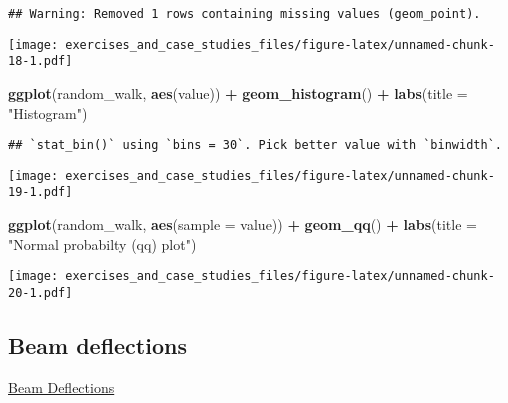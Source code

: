 \documentclass[]{book}
\newenvironment{Shaded}{\begin{snugshade}}{\end{snugshade}}
\newcommand{\DataTypeTok}[1]{\textcolor[rgb]{0.13,0.29,0.53}{#1}}
\newcommand{\DecValTok}[1]{\textcolor[rgb]{0.00,0.00,0.81}{#1}}
\newcommand{\KeywordTok}[1]{\textcolor[rgb]{0.13,0.29,0.53}{\textbf{#1}}}
\newcommand{\NormalTok}[1]{#1}
\newcommand{\OperatorTok}[1]{\textcolor[rgb]{0.81,0.36,0.00}{\textbf{#1}}}
\newcommand{\StringTok}[1]{\textcolor[rgb]{0.31,0.60,0.02}{#1}}
\theoremstyle{definition}
\theoremstyle{definition}
\theoremstyle{definition}
\theoremstyle{remark}
\begin{document}
\begin{verbatim}
## Warning: Removed 1 rows containing missing values (geom_point).
\end{verbatim}

\texttt{[image: exercises\_and\_case\_studies\_files/figure-latex/unnamed-chunk-18-1.pdf]}

\begin{Shaded}
\begin{Highlighting}[]
\KeywordTok{ggplot}\NormalTok{(random_walk, }\KeywordTok{aes}\NormalTok{(value)) }\OperatorTok{+}
\StringTok{  }\KeywordTok{geom_histogram}\NormalTok{() }\OperatorTok{+}
\StringTok{  }\KeywordTok{labs}\NormalTok{(}\DataTypeTok{title =} \StringTok{"Histogram"}\NormalTok{)}
\end{Highlighting}
\end{Shaded}

\begin{verbatim}
## `stat_bin()` using `bins = 30`. Pick better value with `binwidth`.
\end{verbatim}

\texttt{[image: exercises\_and\_case\_studies\_files/figure-latex/unnamed-chunk-19-1.pdf]}

\begin{Shaded}
\begin{Highlighting}[]
\KeywordTok{ggplot}\NormalTok{(random_walk, }\KeywordTok{aes}\NormalTok{(}\DataTypeTok{sample =}\NormalTok{ value)) }\OperatorTok{+}
\StringTok{  }\KeywordTok{geom_qq}\NormalTok{() }\OperatorTok{+}
\StringTok{  }\KeywordTok{labs}\NormalTok{(}\DataTypeTok{title =} \StringTok{"Normal probabilty (qq) plot"}\NormalTok{)}
\end{Highlighting}
\end{Shaded}

\texttt{[image: exercises\_and\_case\_studies\_files/figure-latex/unnamed-chunk-20-1.pdf]}

\hypertarget{beam-deflections}{%
\subsection{Beam deflections}\label{beam-deflections}}

\href{https://www.itl.nist.gov/div898/handbook/eda/section4/eda425.htm}{Beam
Deflections}

\begin{Shaded}
\end{Shaded}
\end{document}
